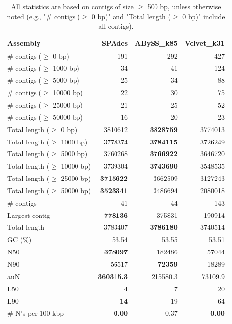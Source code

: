\documentclass[12pt,a4paper]{article}
\begin{document}
\begin{table}[ht]
\begin{center}
\caption{All statistics are based on contigs of size $\geq$ 500 bp, unless otherwise noted (e.g., "\# contigs ($\geq$ 0 bp)" and "Total length ($\geq$ 0 bp)" include all contigs).}
\begin{tabular}{|l*{3}{|r}|}
\hline
Assembly & SPAdes & ABySS\_k85 & Velvet\_k31 \\ \hline
\# contigs ($\geq$ 0 bp) & 191 & 292 & 427 \\ \hline
\# contigs ($\geq$ 1000 bp) & 34 & 41 & 124 \\ \hline
\# contigs ($\geq$ 5000 bp) & 25 & 34 & 88 \\ \hline
\# contigs ($\geq$ 10000 bp) & 22 & 30 & 75 \\ \hline
\# contigs ($\geq$ 25000 bp) & 21 & 25 & 52 \\ \hline
\# contigs ($\geq$ 50000 bp) & 16 & 20 & 23 \\ \hline
Total length ($\geq$ 0 bp) & 3810612 & {\bf 3828759} & 3774013 \\ \hline
Total length ($\geq$ 1000 bp) & 3778374 & {\bf 3784115} & 3726249 \\ \hline
Total length ($\geq$ 5000 bp) & 3760268 & {\bf 3766922} & 3646720 \\ \hline
Total length ($\geq$ 10000 bp) & 3739304 & {\bf 3743690} & 3548535 \\ \hline
Total length ($\geq$ 25000 bp) & {\bf 3715622} & 3662509 & 3127243 \\ \hline
Total length ($\geq$ 50000 bp) & {\bf 3523341} & 3486694 & 2080018 \\ \hline
\# contigs & 41 & 44 & 143 \\ \hline
Largest contig & {\bf 778136} & 375831 & 190914 \\ \hline
Total length & 3783407 & {\bf 3786180} & 3740514 \\ \hline
GC (\%) & 53.54 & 53.55 & 53.51 \\ \hline
N50 & {\bf 378097} & 182486 & 57044 \\ \hline
N90 & 56517 & {\bf 72359} & 18289 \\ \hline
auN & {\bf 360315.3} & 215580.3 & 73109.9 \\ \hline
L50 & {\bf 4} & 7 & 20 \\ \hline
L90 & {\bf 14} & 19 & 64 \\ \hline
\# N's per 100 kbp & {\bf 0.00} & 0.37 & {\bf 0.00} \\ \hline
\end{tabular}
\end{center}
\end{table}
\end{document}
